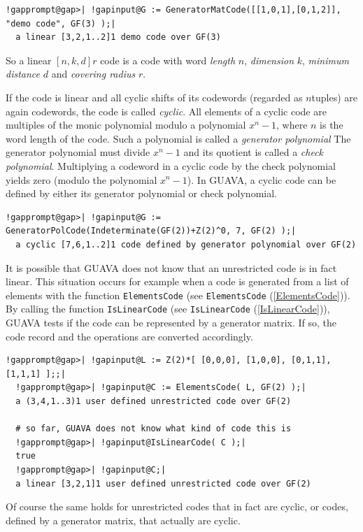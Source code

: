 \documentclass[a4paper,11pt]{report}
\begin{document}
{\begin{Verbatim}[commandchars=!@|,fontsize=\small,frame=single,label=Example]
  !gapprompt@gap>| !gapinput@G := GeneratorMatCode([[1,0,1],[0,1,2]], "demo code", GF(3) );|
  a linear [3,2,1..2]1 demo code over GF(3)
\end{Verbatim}
 So a linear $[n, k, d]r$ code  is a code with word \emph{length} $n$, \emph{dimension} $k$, \emph{minimum distance} $d$ and \emph{covering radius} $r$. 

 If the code is linear and all cyclic shifts of its codewords (regarded as $n$\texttt{}tuples) are again codewords, the code is called \emph{cyclic}.  All elements of a cyclic code are multiples of the monic polynomial modulo a
polynomial $x^n -1$, where $n$ is the word length of the code. Such a polynomial is called a \emph{generator polynomial}  The generator polynomial must divide $x^n-1$ and its quotient is called a \emph{check polynomial}.  Multiplying a codeword in a cyclic code by the check polynomial yields zero
(modulo the polynomial $x^n -1$). In \textsf{GUAVA}, a cyclic code can be defined by either its generator polynomial or check
polynomial. 
\begin{Verbatim}[commandchars=!@|,fontsize=\small,frame=single,label=Example]
  !gapprompt@gap>| !gapinput@G := GeneratorPolCode(Indeterminate(GF(2))+Z(2)^0, 7, GF(2) );|
  a cyclic [7,6,1..2]1 code defined by generator polynomial over GF(2)
\end{Verbatim}
 It is possible that \textsf{GUAVA} does not know that an unrestricted code is in fact linear. This situation
occurs for example when a code is generated from a list of elements with the
function \texttt{ElementsCode} (see \texttt{ElementsCode} (\ref{ElementsCode})). By calling the function \texttt{IsLinearCode} (see \texttt{IsLinearCode} (\ref{IsLinearCode})), \textsf{GUAVA} tests if the code can be represented by a generator matrix. If so, the code
record and the operations are converted accordingly. 
\begin{Verbatim}[commandchars=!@|,fontsize=\small,frame=single,label=Example]
  !gapprompt@gap>| !gapinput@L := Z(2)*[ [0,0,0], [1,0,0], [0,1,1], [1,1,1] ];;|
  !gapprompt@gap>| !gapinput@C := ElementsCode( L, GF(2) );|
  a (3,4,1..3)1 user defined unrestricted code over GF(2)
  
  # so far, GUAVA does not know what kind of code this is
  !gapprompt@gap>| !gapinput@IsLinearCode( C );|
  true
  !gapprompt@gap>| !gapinput@C;|
  a linear [3,2,1]1 user defined unrestricted code over GF(2)
\end{Verbatim}
  Of course the same holds for unrestricted codes that in fact are cyclic, or
codes, defined by a generator matrix, that actually are cyclic. 

}
\end{document}
